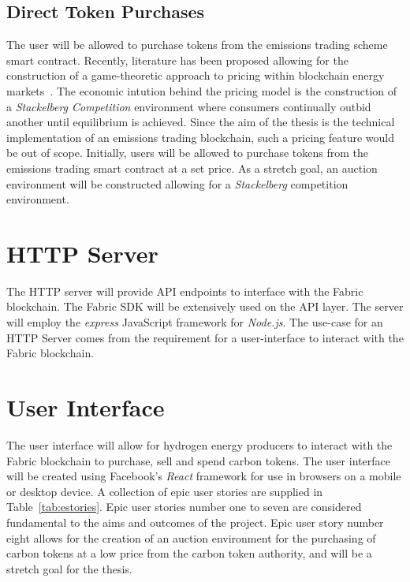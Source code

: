 \subsection{Direct Token Purchases}
The user will be allowed to purchase tokens from the
emissions trading scheme smart contract. Recently, literature
has been proposed allowing for the
construction of a game-theoretic approach to
pricing within blockchain energy markets~\cite{JIANG2020115239}.
The economic intution behind the pricing model is the
construction of a \textit{Stackelberg Competition} environment
where consumers continually outbid another until
equilibrium is achieved. Since the aim of the thesis
is the technical implementation of an emissions trading
blockchain, such a pricing feature would be out of scope.
Initially, users will be allowed to purchase tokens from the
emissions trading smart contract at a set price. As a
stretch goal, an auction environment will be constructed
allowing for a \textit{Stackelberg} competition
environment.

\section{HTTP Server}
The HTTP server will provide API endpoints to interface
with the Fabric blockchain. The Fabric SDK will be
extensively used on the API layer. The server will
employ the \textit{express} JavaScript framework
for \textit{Node.js}. The use-case for an HTTP Server
comes from the requirement for a user-interface to
interact with the Fabric blockchain.

\section{User Interface}
The user interface will allow for hydrogen energy producers
to interact with the Fabric blockchain to
purchase, sell and spend carbon tokens. The
user interface will be created using Facebook's
\textit{React} framework for use in browsers on a
mobile or desktop device. A collection of epic
user stories are supplied in Table~\ref{tab:estories}.
Epic user stories number one to seven are considered
fundamental to the aims and outcomes of the project.
Epic user story number eight allows for the creation of
an auction environment for the purchasing of carbon
tokens at a low price from the carbon token authority,
and will be a stretch goal for the thesis.

